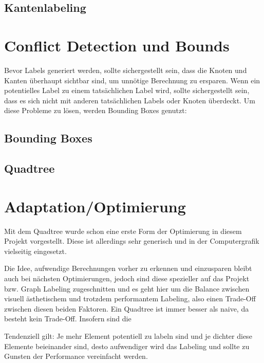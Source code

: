 \documentclass[final,nopreprintline]{elsarticle}
\begin{document}
\subsection{Kantenlabeling}
\label{subsec:labeling_edges}
    


\section{Conflict Detection und Bounds}
\label{sec:conflict}

Bevor Labels generiert werden, sollte sichergestellt sein, dass die Knoten und Kanten überhaupt sichtbar sind,
um unnötige Berechnung zu ersparen. Wenn ein potentielles Label zu einem tatsächlichen Label wird, sollte sichergestellt sein,
dass es sich nicht mit anderen tatsächlichen Labels oder Knoten überdeckt. Um diese Probleme zu lösen, werden Bounding Boxes genutzt:

\subsection{Bounding Boxes}
\label{subsec:bbox}
    

\subsection{Quadtree}
\label{subsec:quadtree}
    


\section{Adaptation/Optimierung}
\label{sec:adaptation}

Mit dem Quadtree wurde schon eine erste Form der Optimierung in diesem Projekt vorgestellt.
Diese ist allerdings sehr generisch und in der Computergrafik vielseitig eingesetzt.

Die Idee, aufwendige Berechnungen vorher zu erkennen und einzusparen bleibt auch bei nächsten Optimierungen, jedoch sind diese
spezieller auf das Projekt bzw. Graph Labeling zugeschnitten und es geht hier um die Balance zwischen visuell ästhetischem und trotzdem performantem Labeling,
also einen Trade-Off zwischen diesen beiden Faktoren. Ein Quadtree ist immer besser als naive, da besteht kein Trade-Off.
Insofern sind die

Tendenziell gilt: Je mehr Element potentiell zu labeln sind und je dichter diese Elemente beieinander sind, desto aufwendiger wird das Labeling und sollte zu Gunsten der Performance vereinfacht werden.
\end{document}
